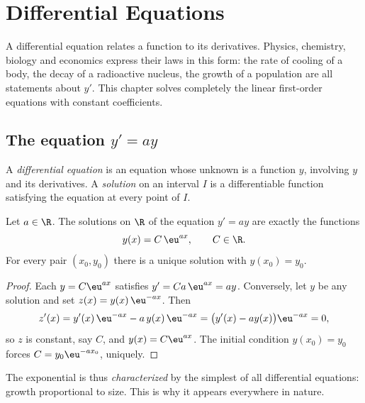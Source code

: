 \chapter{Differential Equations}\label{ch:tle:diffeq}

A differential equation relates a function to its derivatives. Physics,
chemistry, biology and economics express their laws in this form: the rate of
cooling of a body, the decay of a radioactive nucleus, the growth of a
population are all statements about $y'$. This chapter solves completely the
linear first-order equations with constant coefficients.

\section{The equation \texorpdfstring{$y' = ay$}{y' = ay}}

\begin{definition}\label{def:tle:diffeq:ode}
A \emph{differential equation} is an equation
whose unknown is a function $y$, involving $y$ and its derivatives. A
\emph{solution} on an interval $I$ is a differentiable function satisfying
the equation at every point of $I$.
\end{definition}

\begin{theorem}[Solutions of $y' = ay$]\label{thm:tle:diffeq:homogeneous}
Let $a \in \R$. The solutions on $\R$ of the equation $y' = ay$ are exactly
the functions
\[
y(x) = C\,\eu^{ax}, \qquad C \in \R .
\]
For every pair $(x_0, y_0)$ there is a unique solution with
$y(x_0) = y_0$.
\end{theorem}

\begin{proof}
Each $y = C\eu^{ax}$ satisfies $y' = Ca\,\eu^{ax} = ay$. Conversely, let $y$
be any solution and set $z(x) = y(x)\,\eu^{-ax}$. Then
\[
z'(x) = y'(x)\,\eu^{-ax} - a\,y(x)\,\eu^{-ax}
= \bigl(y'(x) - a y(x)\bigr)\eu^{-ax} = 0,
\]
so $z$ is constant, say $C$, and $y(x) = C\eu^{ax}$. The initial condition
$y(x_0) = y_0$ forces $C = y_0 \eu^{-a x_0}$, uniquely.
\end{proof}

\begin{remark}
The exponential is thus \emph{characterized} by the simplest of all
differential equations: growth proportional to size. This is why it appears
everywhere in nature.
\end{remark}

